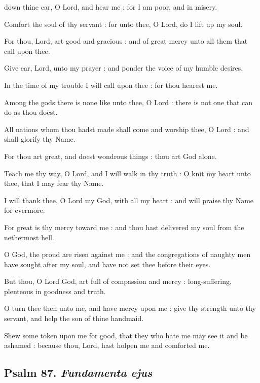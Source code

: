  down thine ear, O Lord, and hear me : for I am poor, and in misery.\par
{}
Comfort the soul of thy servant : for unto thee, O Lord, do I lift up my soul.\par
{}For thou, Lord, art good and gracious : and of great mercy unto all them that call upon thee.\par
{}Give ear, Lord, unto my prayer : and ponder the voice of my humble desires.\par
{}In the time of my trouble I will call upon thee : for thou hearest me.\par
{}Among the gods there is none like unto thee, O Lord : there is not one that can do as thou doest.\par
{}All nations whom thou hadst made shall come and worship thee, O Lord : and shall glorify thy Name.\par
{}For thou art great, and doest wondrous things : thou art God alone.\par
{}Teach me thy way, O Lord, and I will walk in thy truth : O knit my heart unto thee, that I may fear thy Name.\par
{}I will thank thee, O Lord my God, with all my heart : and will praise thy Name for evermore.\par
{}For great is thy mercy toward me : and thou hast delivered my soul from the nethermost hell.\par
{}O God, the proud are risen against me : and the congregations of naughty men have sought after my soul, and have not set thee before their eyes.\par
{}But thou, O Lord God, art full of compassion and mercy : long-suffering, plenteous in goodness and truth.\par
{}O turn thee then unto me, and have mercy upon me : give thy strength unto thy servant, and help the son of thine handmaid.\par
{}Shew some token upon me for good, that they who hate me may see it and be ashamed : because thou, Lord, hast holpen me and comforted me.\par

\clearpage
\subsection{Psalm 87. \textit{Fundamenta ejus}}

